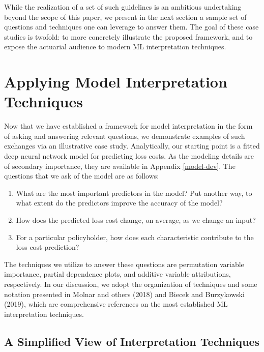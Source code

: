 \documentclass[preprint, 3p, twocolumn, letterpaper, 10pt]{elsarticle} %
\providecommand{\tightlist}{%
  \setlength{\itemsep}{0pt}\setlength{\parskip}{0pt}}
\begin{document}
While the realization of a set of such guidelines is an ambitious undertaking
beyond the scope of this paper, we present in the next section a sample set of
questions and techniques one can leverage to answer them. The goal of these case
studies is twofold: to more concretely illustrate the proposed framework, and
to expose the actuarial audience to modern ML interpretation techniques.

\hypertarget{application}{%
\section{Applying Model Interpretation Techniques}\label{application}}

Now that we have established a framework for model interpretation in the form of
asking and answering relevant questions, we demonstrate examples of such
exchanges via an illustrative case study. Analytically, our starting point is a
fitted deep neural network model for predicting loss costs. As the modeling
details are of secondary importance, they are available in Appendix
\ref{model-dev}. The questions that we ask of the model are as follows:

\begin{enumerate}
\def\labelenumi{\arabic{enumi}.}
\tightlist
\item
  What are the most important predictors in the model? Put another way, to
  what extent do the predictors improve the accuracy of the model?
\item
  How does the predicted loss cost change, on average, as we change an input?
\item
  For a particular policyholder, how does each characteristic contribute to
  the loss cost prediction?
\end{enumerate}

The techniques we utilize to answer these questions are permutation variable
importance, partial dependence plots, and additive variable attributions,
respectively.
In our discussion, we adopt the organization of techniques and some notation
presented in Molnar and others (2018) and Biecek and Burzykowski (2019), which are comprehensive
references on the most established ML interpretation techniques.

\hypertarget{a-simplified-view-of-interpretation-techniques}{%
\subsection{A Simplified View of Interpretation Techniques}\label{a-simplified-view-of-interpretation-techniques}}
\end{document}
